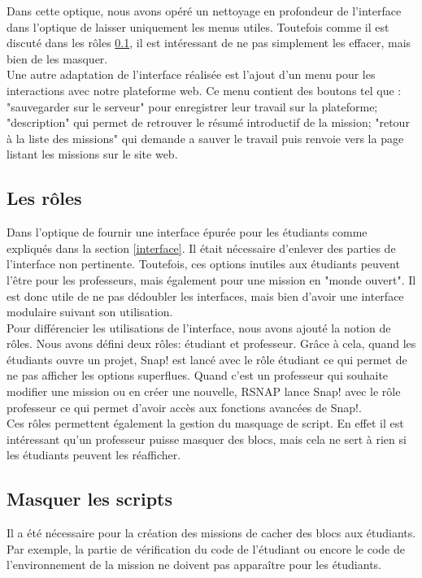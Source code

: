 Dans cette optique, nous avons opéré un nettoyage en profondeur de l'interface dans l'optique de laisser uniquement les menus utiles. Toutefois comme il est discuté dans les rôles \ref{role}, il est intéressant de ne pas simplement les effacer, mais bien de les masquer.\\

Une autre adaptation de l'interface réalisée est l'ajout d'un menu pour les interactions avec notre plateforme web. Ce menu contient des boutons tel que : "sauvegarder sur le serveur" pour enregistrer leur travail sur la plateforme; "description" qui permet de retrouver le résumé introductif de la mission; "retour à la liste des missions" qui demande a sauver le travail puis renvoie vers la page listant les missions sur le site web.

\subsection{Les rôles}
\label{role}
Dans l'optique de fournir une interface épurée pour les étudiants comme expliqués dans la section \ref{interface}. Il était nécessaire d'enlever des parties de l'interface non pertinente. Toutefois, ces options inutiles aux étudiants peuvent l'être pour les professeurs, mais également pour une mission en "monde ouvert". Il est donc utile de ne pas dédoubler les interfaces, mais bien d'avoir une interface modulaire suivant son utilisation. \\

Pour différencier les utilisations de l'interface, nous avons ajouté la notion de rôles. Nous avons défini deux rôles: étudiant et professeur. Grâce à cela, quand les étudiants ouvre un projet, Snap! est lancé avec le rôle étudiant ce qui permet de ne pas afficher les options superflues. Quand c'est un professeur qui souhaite modifier une mission ou en créer une nouvelle, RSNAP lance Snap! avec le rôle professeur ce qui permet d'avoir accès aux fonctions avancées de Snap!.\\

Ces rôles permettent également la gestion du masquage de script. En effet il est intéressant qu'un professeur puisse masquer des blocs, mais cela ne sert à rien si les étudiants peuvent les réafficher.

\subsection{Masquer les scripts}
Il a été nécessaire pour la création des missions de cacher des blocs aux étudiants. Par exemple, la partie de vérification du code de l'étudiant ou encore le code de l'environnement de la mission ne doivent pas apparaître pour les étudiants. 

